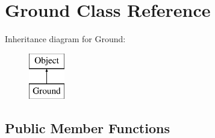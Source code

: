 \hypertarget{class_ground}{}\section{Ground Class Reference}
\label{class_ground}
Inheritance diagram for Ground\+:\begin{figure}[H]
\begin{center}
\leavevmode
\includegraphics[height=2.000000cm]{class_ground}
\end{center}
\end{figure}
\subsection*{Public Member Functions}
